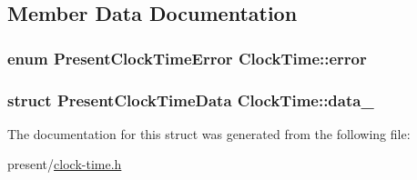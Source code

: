 \subsection{\-Member \-Data \-Documentation}
\hypertarget{structClockTime_a58f5305f36468eee0d1c489b5d72d717}{
\subsubsection[{error}]{\setlength{\rightskip}{0pt plus 5cm}enum {\bf \-Present\-Clock\-Time\-Error} {\bf \-Clock\-Time\-::error}}}\label{structClockTime_a58f5305f36468eee0d1c489b5d72d717}
\hypertarget{structClockTime_a3fe115dffef3ba153e1fff6e0b2c0a23}{
\subsubsection[{data\-\_\-}]{\setlength{\rightskip}{0pt plus 5cm}struct \-Present\-Clock\-Time\-Data {\bf \-Clock\-Time\-::data\-\_\-}}}\label{structClockTime_a3fe115dffef3ba153e1fff6e0b2c0a23}


\-The documentation for this struct was generated from the following file\-:\begin{DoxyCompactItemize}
\item 
present/\hyperlink{clock-time_8h}{clock-\/time.\-h}\end{DoxyCompactItemize}

